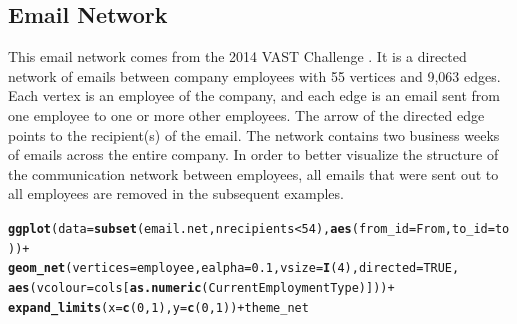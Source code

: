 \documentclass[11pt]{article}\usepackage[]{graphicx}\usepackage[]{color}
\makeatletter
\newcommand{\hlnum}[1]{\textcolor[rgb]{0.686,0.059,0.569}{#1}}%
\newcommand{\hlopt}[1]{\textcolor[rgb]{0,0,0}{#1}}%
\newcommand{\hlstd}[1]{\textcolor[rgb]{0.345,0.345,0.345}{#1}}%
\newcommand{\hlkwc}[1]{\textcolor[rgb]{0.333,0.667,0.333}{#1}}%
\newcommand{\hlkwd}[1]{\textcolor[rgb]{0.737,0.353,0.396}{\textbf{#1}}}%
\newenvironment{kframe}{%
 \def\at@end@of@kframe{}%
 \ifinner\ifhmode%
  \def\at@end@of@kframe{\end{minipage}}%
  \begin{minipage}{\columnwidth}%
 \fi\fi%
 \def\FrameCommand##1{\hskip\@totalleftmargin \hskip-\fboxsep
 \colorbox{shadecolor}{##1}\hskip-\fboxsep
     \hskip-\linewidth \hskip-\@totalleftmargin \hskip\columnwidth}%
 \MakeFramed {\advance\hsize-\width
   \@totalleftmargin\z@ \linewidth\hsize
   \@setminipage}}%
 {\par\unskip\endMakeFramed%
 \at@end@of@kframe}
\newenvironment{knitrout}{}{} %
\makeatother
\begin{document}
\subsection{Email Network}
  This email network comes from the 2014 VAST Challenge \citep{emailnet}. It is a directed network of emails between company employees with 55 vertices and 9,063 edges. Each vertex is an employee of the company, and each edge is an email sent from one employee to one or more other employees. The arrow of the directed edge points to the recipient(s) of the email. The network contains two business weeks of emails across the entire company. In order to better visualize the structure of the communication network between employees, all emails that were sent out to all employees are removed in the subsequent examples.
\begin{knitrout}
\color{fgcolor}\begin{kframe}
\begin{alltt}
\hlkwd{ggplot}\hlstd{(}\hlkwc{data} \hlstd{=} \hlkwd{subset}\hlstd{(email.net, nrecipients} \hlopt{<} \hlnum{54}\hlstd{),} \hlkwd{aes}\hlstd{(}\hlkwc{from_id} \hlstd{= From,} \hlkwc{to_id} \hlstd{= to))} \hlopt{+}
  \hlkwd{geom_net}\hlstd{(}\hlkwc{vertices} \hlstd{= employee,}\hlkwc{ealpha} \hlstd{=} \hlnum{0.1}\hlstd{,} \hlkwc{vsize} \hlstd{=} \hlkwd{I}\hlstd{(}\hlnum{4}\hlstd{),} \hlkwc{directed} \hlstd{=} \hlnum{TRUE}\hlstd{,}
           \hlkwd{aes}\hlstd{(}\hlkwc{vcolour}\hlstd{=cols[}\hlkwd{as.numeric}\hlstd{(CurrentEmploymentType)]))} \hlopt{+}
  \hlkwd{expand_limits}\hlstd{(}\hlkwc{x}\hlstd{=}\hlkwd{c}\hlstd{(}\hlnum{0}\hlstd{,}\hlnum{1}\hlstd{),} \hlkwc{y} \hlstd{=} \hlkwd{c}\hlstd{(}\hlnum{0}\hlstd{,}\hlnum{1}\hlstd{))} \hlopt{+} \hlstd{theme_net}
\end{alltt}


{\ttfamily\noindent\bfseries\color{errorcolor}{\#\# Error in subset(email.net, nrecipients < 54): object 'email.net' not found}}\end{kframe}
\end{knitrout}
\end{document}
